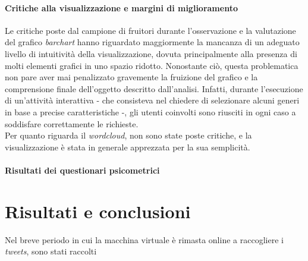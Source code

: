 \documentclass[12pt, a4paper, twocolumn]{article} %
\begin{document}
\subsection{Critiche alla visualizzazione e margini di miglioramento}
Le critiche poste dal campione di fruitori durante l'osservazione e la valutazione del grafico \textit{barchart} hanno riguardato maggiormente la mancanza di un adeguato livello di intuitività della visualizzazione, dovuta principalmente alla presenza di molti elementi grafici in uno spazio ridotto. 
Nonostante ciò, questa problematica non pare aver mai penalizzato gravemente la fruizione del grafico e la comprensione finale dell'oggetto descritto dall'analisi. 
Infatti, durante l'esecuzione di un'attività interattiva - che consisteva nel chiedere di selezionare alcuni generi in base a precise caratteristiche -, gli utenti coinvolti sono riusciti in ogni caso a soddisfare correttamente le richieste. \\
Per quanto riguarda il \textit{wordcloud}, non sono state poste critiche, e la visualizzazione è stata in generale apprezzata per la sua semplicità.

\subsection{Risultati dei questionari psicometrici}

\hfill
\newpage
\part{Risultati e conclusioni}
Nel breve periodo in cui la macchina virtuale è rimasta online a raccogliere i \textit{tweets}, sono stati raccolti 




\hfill
\newpage
\printbibliography[title={Bibliografia e sitografia}]

\end{document}
